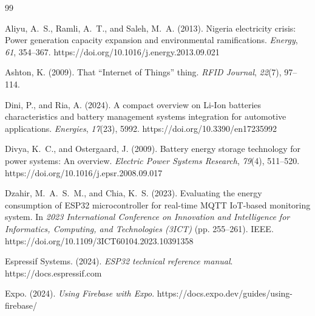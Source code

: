 \documentclass[12pt, a4paper]{report}
\begin{document}
{%

\newpage


\setlength{\bibsep}{10pt}
\renewcommand{\bibname}{REFERENCES}

\begin{thebibliography}{99}
\setlength{\itemsep}{8pt}

Aliyu, A.~S., Ramli, A.~T., and Saleh, M.~A. (2013).
Nigeria electricity crisis: Power generation capacity expansion and
environmental ramifications.
\textit{Energy}, \textit{61}, 354--367.
https://doi.org/10.1016/j.energy.2013.09.021

Ashton, K. (2009).
That ``Internet of Things'' thing.
\textit{RFID Journal}, \textit{22}(7), 97--114.

Dini, P., and Ria, A. (2024).
A compact overview on Li-Ion batteries characteristics and battery management
systems integration for automotive applications.
\textit{Energies}, \textit{17}(23), 5992.
https://doi.org/10.3390/en17235992

Divya, K.~C., and Ostergaard, J. (2009).
Battery energy storage technology for power systems: An overview.
\textit{Electric Power Systems Research}, \textit{79}(4), 511--520.
https://doi.org/10.1016/j.epsr.2008.09.017

Dzahir, M.~A.~S.~M., and Chia, K.~S. (2023).
Evaluating the energy consumption of ESP32 microcontroller for real-time
MQTT IoT-based monitoring system.
In \textit{2023 International Conference on Innovation and Intelligence for
Informatics, Computing, and Technologies (3ICT)} (pp. 255--261). IEEE.
https://doi.org/10.1109/3ICT60104.2023.10391358

Espressif Systems. (2024).
\textit{ESP32 technical reference manual}.
https://docs.espressif.com

Expo. (2024).
\textit{Using Firebase with Expo}.
https://docs.expo.dev/guides/using-firebase/


\end{thebibliography}}
\end{document}
